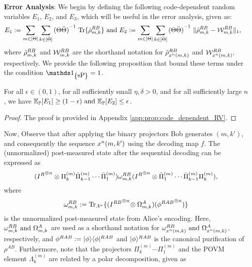 \noindent\textbf{Error Analysis}: We begin by defining the following code-dependent random variables \(E_1\), \(E_2\), and \(E_3\), which will be useful in the error analysis, given as:
\begin{align*}
    E_1 := \sum_{m\in [\Theta]}\sum_{k\in [\bar{\Theta}]} {(\Theta\bar{\Theta})}^{-1}\ &\text{Tr}\{\tilde{\rho}_{m,k}^{R B}\}\text{ and } E_2 := \sum_{m\in [\Theta]}\sum_{k\in [\bar{\Theta}]}{(\Theta\bar{\Theta})}^{-1}\ \|\tilde{\rho}_{m,k}^{R B} - \mathcal{W}^{R B}_{m,k}\|_1,
\end{align*}
where $\tilde{\rho}_{m,k}^{R B}$ and $\mathcal{W}_{m,k}^{R B}$ are the shorthand notation for $\tilde{\rho}_{x^n(m,k)}^{R B}$ and $\mathcal{W}_{x^n(m,k)}^{R B},$ respectively. We provide the following proposition that bound these terms under the condition $\I_{\curly{\mbox{\normalfont sP}}} = 1$.
\begin{prop}\label{prop:code_dependent_RV}
For all $\epsilon\in(0,1)$, for all sufficiently small $\eta, \delta>0$, and for all sufficiently large $n$, we have $\mathbb{E}_{\mathbb{P}}[E_1]\geq (1-\epsilon) \text{ and }  \mathbb{E}_{\mathbb{P}}[E_2]\leq \epsilon$.
\end{prop}
\begin{proof}
    The proof is provided in Appendix \ref{app:prop:code_dependent_RV}.
\end{proof}
Now, Observe that after applying the binary projectors Bob generates $(m,k')$, and consequently the sequence $x^n(m,k')$ using the decoding map $f$. The (unnormalized) post-measured state after the sequential decoding can be expressed as
$$({I^{R}}^{\otimes n}\otimes \Pi_{k}^{(m)}\bar{\Pi}_{k-1}^{(m)}\cdots \bar{\Pi}_{1}^{(m)})\omega^{R B}_{m,k} ({I^{R}}^{\otimes n}\otimes \bar{\Pi}_{1}^{(m)} \cdots \bar{\Pi}_{k-1}^{(m)}\Pi_{k}^{(m)}),$$ where 
\vspace{-10pt}\begin{equation}\label{eqn:omegamk}
    \omega_{m,k}^{R B} := \text{Tr}_{A^n}\{({I^{R B}}^{\otimes n}\!\otimes \Omega_{m,k}^{A})({\phi^{R AB}}^{\otimes n})\} 
\end{equation}
is the unnormalized post-measured state from Alice's encoding. Here, $\omega_{m,k}^{R B} \text{ and }  \Omega_{m,k}^{A}$ are used as a shorthand notation for $\omega_{x^n(m,k)}^{R B} \text{ and } \Omega_{x^n(m,k)}^{A}$, respectively, and  $\phi^{R A B}:= |\phi\rangle\langle\phi|^{R AB}$ and $|\phi\rangle^{R AB} $ is the canonical purification of $\rho^{AB}$. Furthermore, note that the projectors $\Pi_{k}^{(m)}\cdots \Pi_{1}^{(m)}$ and the POVM element ${\Lambda_{k}^{(m)}}$ are related by a polar decomposition, given as
